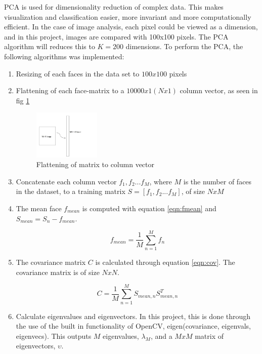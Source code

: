 \documentclass[a4paper]{article}
\begin{document}
PCA is used for dimensionality reduction of complex data. This makes visualization and classification easier, more invariant and more computationally efficient. In the case of image analysis, each pixel could be viewed as a dimension, and in this project, images are compared with 100x100 pixels. The PCA algorithm will reduces this to $K=200$ dimensions. 
To perform the PCA, the following algorithms was implemented:  
\begin{enumerate}
\item Resizing of each faces in the data set to $100x100$ pixels
\item Flattening of each face-matrix to a $10000x1  (Nx1)$  column vector, as seen in fig \ref{fig:flatten}

\begin{figure}
\centering
\includegraphics[width=0.3\textwidth]{images/Flatten.JPG}
\caption{\label{fig:flatten}Flattening of matrix to column vector}
\end{figure}


\item Concatenate each column vector $f_1, f_2 ... f_M$, where $M$ is the number of faces in the dataset, to a training matrix $S = [f_1, f_2 ... f_M]$, of size $N x M$
\item The mean face $f_{mean}$ is computed with equation \ref{eqn:fmean} and $S_{mean} = S_n - f_{mean}$. 

\begin{equation}
f_{mean} = \dfrac{1}{M} \sum_{n=1}^{M} f_n
\label{eqn:fmean}
\end{equation}

\item The covariance matrix $C$ is calculated through equation \ref{eqn:cov}. The covariance matrix is of size $N x N$.

\begin{equation}
C = \dfrac{1}{M} \sum_{n=1}^{M} S_{mean, n}S_{mean,n}^T
\label{eqn:cov}
\end{equation}

\item Calculate eigenvalues and eigenvectors. In this project, this is done through the use of the built in functionality of OpenCV, eigen(covariance, eigenvals, eigenvecs). This outputs $M$ eigenvalues, $\lambda_M$, and a $M x M$ matrix of eigenvectors, $\upsilon$. 


\end{enumerate}
\end{document}
